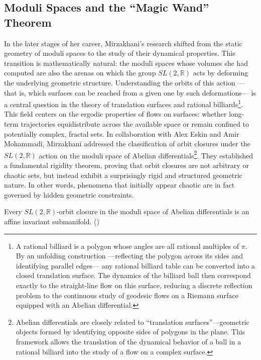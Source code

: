 \subsection{Moduli Spaces and the ``Magic Wand'' Theorem}

In the later stages of her career, Mirzakhani's research shifted from the static geometry of moduli spaces to the study of their dynamical properties. This transition is mathematically natural: the moduli spaces whose volumes she had computed are also the arenas on which the group $SL(2,\mathbb{R})$ acts by deforming the underlying geometric structure. Understanding the orbits of this action —that is, which surfaces can be reached from a given one by such deformations— is a central question in the theory of translation surfaces and rational billiards\footnote{A rational billiard is a polygon whose angles are all rational multiples of $\pi$. By an unfolding construction —reflecting the polygon across its sides and identifying parallel edges— any rational billiard table can be converted into a closed translation surface. The dynamics of the billiard ball then correspond exactly to the straight-line flow on this surface, 
reducing a discrete reflection problem to the continuous study of geodesic flows on a Riemann surface equipped with an Abelian 
differential.}. This field centers on the ergodic properties of flows on surfaces: whether long-term trajectories equidistribute across the available space or remain confined to potentially complex, fractal sets. 
In collaboration with Alex Eskin and Amir Mohammadi, Mirzakhani addressed the classification of orbit closures under the $SL(2,\mathbb{R})$ action on the moduli space of Abelian differentials\footnote{Abelian differentials are closely related to ``translation surfaces''—geometric objects formed by identifying opposite sides of polygons in the plane. This framework allows the translation of the dynamical behavior of a ball in a rational billiard into the study of a flow on a complex surface.}. 
They established a fundamental rigidity theorem, proving that orbit closures are not arbitrary or chaotic sets, but instead exhibit a surprisingly rigid and structured geometric nature. 
In other words, phenomena that initially appear chaotic are in fact governed by hidden geometric constraints.

\begin{theorem}
Every $SL(2,\mathbb{R})$-orbit closure in the moduli space of Abelian differentials is an affine invariant submanifold. (\cite{Eskin2015,Eskin2018})
\end{theorem}

